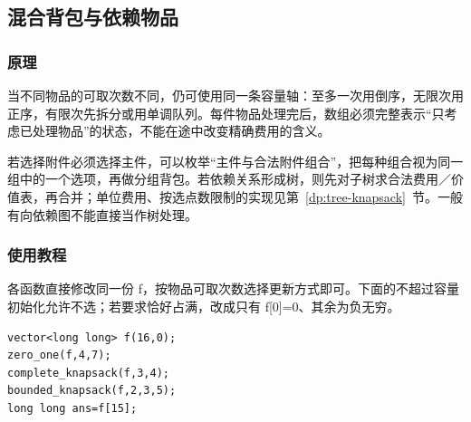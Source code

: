 \subsection{混合背包与依赖物品}
\label{dp:mixed-knapsack}
\subsubsection*{原理}

当不同物品的可取次数不同，仍可使用同一条容量轴：至多一次用倒序，无限次用正序，有限次先拆分或用单调队列。每件物品处理完后，数组必须完整表示“只考虑已处理物品”的状态，不能在途中改变精确费用的含义。

若选择附件必须选择主件，可以枚举“主件与合法附件组合”，把每种组合视为同一组中的一个选项，再做分组背包。若依赖关系形成树，则先对子树求合法费用／价值表，再合并；单位费用、按选点数限制的实现见第~\ref{dp:tree-knapsack}~节。一般有向依赖图不能直接当作树处理。

\subsubsection*{使用教程}
各函数直接修改同一份 f，按物品可取次数选择更新方式即可。下面的不超过容量初始化允许不选；若要求恰好占满，改成只有 f[0]=0、其余为负无穷。
\begin{lstlisting}[style=mtycpp,numbers=none]
vector<long long> f(16,0);
zero_one(f,4,7);
complete_knapsack(f,3,4);
bounded_knapsack(f,2,3,5);
long long ans=f[15];
\end{lstlisting}
